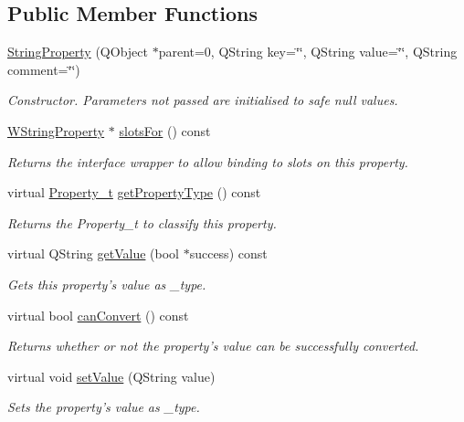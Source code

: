 \subsection*{Public Member Functions}
\begin{DoxyCompactItemize}
\item 
\hyperlink{class_string_property_a587299d1879f0d70741a53afb895dce0}{String\-Property} (Q\-Object $\ast$parent=0, Q\-String key=\char`\"{}\char`\"{}, Q\-String value=\char`\"{}\char`\"{}, Q\-String comment=\char`\"{}\char`\"{})
\begin{DoxyCompactList}\small\item\em Constructor. Parameters not passed are initialised to safe null values. \end{DoxyCompactList}\item 
\hyperlink{class_w_string_property}{W\-String\-Property} $\ast$ \hyperlink{class_string_property_a3a9342b9b32b2ababdaec43cf3849b87}{slots\-For} () const 
\begin{DoxyCompactList}\small\item\em Returns the interface wrapper to allow binding to slots on this property. \end{DoxyCompactList}\item 
virtual \hyperlink{group___property_classes_ga38f1ccddda12c7cb50b868c9f789ee37}{Property\-\_\-t} \hyperlink{class_string_property_aa9a92e89f0076598d9651bc3269dbace}{get\-Property\-Type} () const 
\begin{DoxyCompactList}\small\item\em Returns the Property\-\_\-t to classify this property. \end{DoxyCompactList}\item 
virtual Q\-String \hyperlink{class_string_property_a7130232ef2d861bf098e25f47deb12cb}{get\-Value} (bool $\ast$success) const 
\begin{DoxyCompactList}\small\item\em Gets this property's value as \-\_\-type. \end{DoxyCompactList}\item 
virtual bool \hyperlink{class_string_property_aa080538ba6c8ed9cfde97781dfc416cc}{can\-Convert} () const 
\begin{DoxyCompactList}\small\item\em Returns whether or not the property's value can be successfully converted. \end{DoxyCompactList}\item 
virtual void \hyperlink{class_string_property_afebd41088d80724b87b2a1dcf41423ca}{set\-Value} (Q\-String value)
\begin{DoxyCompactList}\small\item\em Sets the property's value as \-\_\-type. \end{DoxyCompactList}\end{DoxyCompactItemize}
